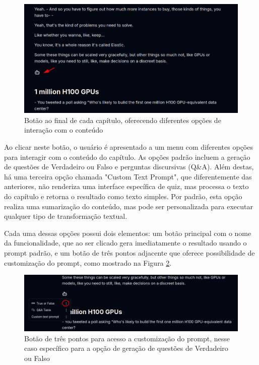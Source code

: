 \documentclass[tcc,capa]{texufpel}
\begin{document}
\begin{figure}[H]
\centering
\includegraphics[width=\textwidth,height=0.45\textheight,keepaspectratio]{exemplo-slides/graphics/images/quizzes/botao-magic-functions.png}
\caption{Botão ao final de cada capítulo, oferecendo diferentes opções de interação com o conteúdo}
\label{fig:magic_functions}
\end{figure}

Ao clicar neste botão, o usuário é apresentado a um menu com diferentes opções para interagir com o conteúdo do capítulo. As opções padrão incluem a geração de questões de Verdadeiro ou Falso e perguntas discursivas (Q\&A). Além destas, há uma terceira opção chamada "Custom Text Prompt", que diferentemente das anteriores, não renderiza uma interface específica de quiz, mas processa o texto do capítulo e retorna o resultado como texto simples. Por padrão, esta opção realiza uma sumarização do conteúdo, mas pode ser personalizada para executar qualquer tipo de transformação textual.

Cada uma dessas opções possui dois elementos: um botão principal com o nome da funcionalidade, que ao ser clicado gera imediatamente o resultado usando o prompt padrão, e um botão de três pontos adjacente que oferece possibilidade de customização do prompt, como mostrado na Figura \ref{fig:three_dots}.

\begin{figure}[H]
\centering
\includegraphics[width=\textwidth,height=0.45\textheight,keepaspectratio]{exemplo-slides/graphics/images/quizzes/three-dots.png}
\caption{Botão de três pontos para acesso a customização do prompt, nesse caso específico para a opção de geração de questões de Verdadeiro ou Falso}
\label{fig:three_dots}
\end{figure}
\end{document}
